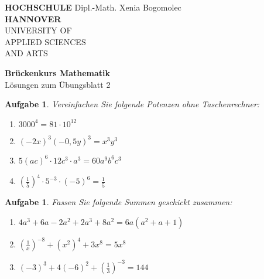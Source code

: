 \documentclass[12pt]{article}
\newtheorem{exercise}[satz]{Aufgabe}
\begin{document}
\pagestyle{empty}
\parindent 0cm
\begin{minipage}{14cm}
  \footnotesize{\textbf{HOCHSCHULE} \hfill Dipl.-Math. Xenia Bogomolec\\
  \textbf{HANNOVER}\\
  UNIVERSITY OF\\
  APPLIED SCIENCES\\
  AND ARTS
  }
\end{minipage}
\vspace{1.0cm}

\begin{center}
  {\Large \bf Br\"uckenkurs Mathematik} \\
  \vspace{0.5cm}
  {\large L\"osungen zum \"Ubungsblatt 2}  \\
\end{center}

\vspace{0.5cm}
\normalsize
\parindent0cm

\begin{exercise}
  Vereinfachen Sie folgende Potenzen ohne Taschenrechner:
  \begin{multicols}{2}
    \begin{enumerate}
      \item[(a)] $3000^4 = 81\cdot10^{12}$
      \item[(b)] $(-2x)^3(-0,5y)^3 = x^3y^3$
      \item[(c)] $5(ac)^6 \cdot 12c^3 \cdot a^3 = 60a^9b^6c^3$
      \item[(d)] $(\frac{1}{5})^4 \cdot 5^{-3} \cdot (-5)^6 = \frac{1}{5}$
    \end{enumerate}
  \end{multicols}
\end{exercise}

\vspace{0.1cm}

\begin{exercise}
  Fassen Sie folgende Summen geschickt zusammen:
  \begin{enumerate}
    \item[(a)] $4a^3+6a-2a^2+2a^3+8a^2 = 6a(a^2+a+1)$
    \item[(b)] $(\frac{1}{x})^{-8}+(x^2)^4+3x^8 = 5x^8$
    \item[(d)] $(-3)^3+4(-6)^2+(\frac{1}{3})^{-3} = 144$ 
  \end{enumerate}
\end{exercise}

\vspace{0.1cm}
\end{document}
